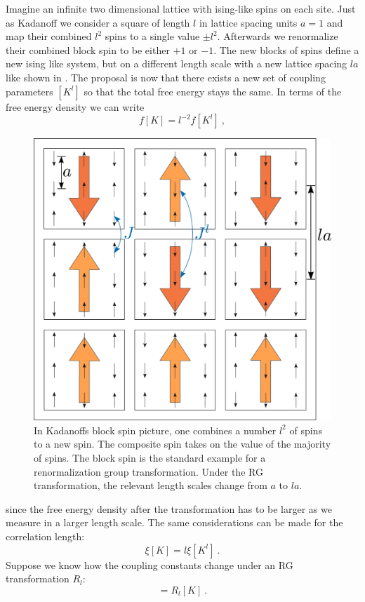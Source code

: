 	Imagine an infinite two dimensional lattice with ising-like spins on each site.  Just as Kadanoff \cite{kadanoff1966scaling} we consider a square of length $l$ in lattice spacing units $a=1$ and map  their combined $l^2$ spins to a single value $\pm l^2$. Afterwards we renormalize their combined block spin to be either $+1$ or $-1$. The new blocks of spins define a new ising like system, but on a different length scale with a new lattice spacing $la$ like shown in . The proposal is now that there exists a new set of coupling parameters $[K^l]$ so that the total free energy stays the same. In terms of the free energy density we can write 
	\begin{equation} \label{free-energy-density}
		f[K] =	l^{-2} f[K^l]~,
	\end{equation}
	\begin{figure}[htp]
		\centering
		\includegraphics[width=0.7\linewidth]{graphics/RG-Iteration.png}
		\caption{In Kadanoffs block spin picture, one combines a number $l^2$ of spins to a new spin. The composite spin takes on the value of the majority of spins. The block spin is the standard example for a renormalization group transformation. Under the RG transformation, the relevant length scales change from $a$ to $la$.}
		\label{Fig::RG-Iteration}
	\end{figure}
	since the free energy density after the transformation has to be larger as we measure in a larger length scale. The same considerations can be made for the correlation length:
	\begin{equation}
		\xi[K] = l \xi[K^l]~.
	\end{equation}
	Suppose we know how the coupling constants change under an RG transformation $R_l$:
	\begin{equation}
		[K^l] =	R_l[K]~.
	\end{equation}

